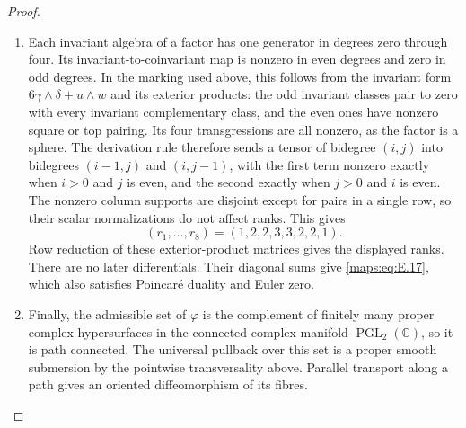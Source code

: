 \begin{proof}
\begin{enumerate}[label={$\langle1\rangle$\arabic*.},leftmargin=*]
\item Each invariant algebra of a factor has one generator in degrees
zero through four.  Its invariant-to-coinvariant map is nonzero
in even degrees and zero in odd degrees.  In the marking used
above, this follows from the invariant form
$6\gamma\wedge\delta+u\wedge w$ and its exterior products:
the odd invariant classes pair to zero with every invariant
complementary class, and the even ones have nonzero square or
top pairing.  Its four transgressions are all nonzero, as the
factor is a sphere.  The derivation rule therefore sends a tensor
of bidegree $(i,j)$ into bidegrees $(i-1,j)$ and $(i,j-1)$,
with the first term nonzero exactly when $i>0$ and $j$ is even,
and the second exactly when $j>0$ and $i$ is even.  The nonzero
column supports are disjoint except for pairs in a single row,
so their scalar normalizations do not affect ranks.  This gives
\[
 (r_1,\ldots,r_8)=(1,2,2,3,3,2,2,1).
\]
Row reduction of these exterior-product matrices gives the displayed ranks.
There are no later differentials.  Their diagonal sums give
\eqref{maps:eq:E.17}, which also satisfies Poincar\'e duality and Euler zero.

\item Finally, the admissible set of $\varphi$ is the complement of
finitely many proper complex hypersurfaces in the connected
complex manifold $\operatorname{PGL}_2(\mathbb C)$, so it is
path connected.  The universal pullback over this set is a
proper smooth submersion by the pointwise transversality above.  Parallel transport along a path gives an oriented
diffeomorphism of its fibres.
\end{enumerate}
\end{proof}

